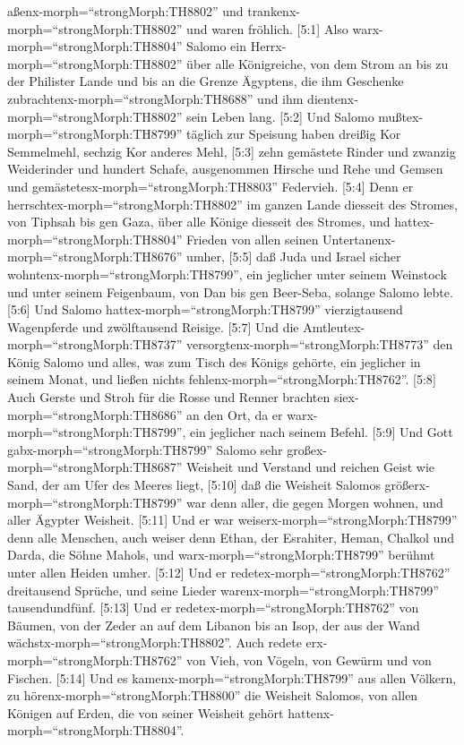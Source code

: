 aßenx-morph=``strongMorph:TH8802'' und
trankenx-morph=``strongMorph:TH8802'' und waren fröhlich. 
{[}5:1{]} Also warx-morph=``strongMorph:TH8804'' Salomo ein
Herrx-morph=``strongMorph:TH8802'' über alle Königreiche, von dem Strom
an bis zu der Philister Lande und bis an die Grenze Ägyptens, die ihm
Geschenke zubrachtenx-morph=``strongMorph:TH8688'' und ihm
dientenx-morph=``strongMorph:TH8802'' sein Leben lang. 
{[}5:2{]} Und Salomo mußtex-morph=``strongMorph:TH8799'' täglich zur
Speisung haben dreißig Kor Semmelmehl, sechzig Kor anderes Mehl,
 {[}5:3{]} zehn gemästete Rinder und zwanzig Weiderinder
und hundert Schafe, ausgenommen Hirsche und Rehe und Gemsen und
gemästetesx-morph=``strongMorph:TH8803'' Federvieh. 
{[}5:4{]} Denn er herrschtex-morph=``strongMorph:TH8802'' im ganzen
Lande diesseit des Stromes, von Tiphsah bis gen Gaza, über alle Könige
diesseit des Stromes, und hattex-morph=``strongMorph:TH8804'' Frieden
von allen seinen Untertanenx-morph=``strongMorph:TH8676'' umher,
 {[}5:5{]} daß Juda und Israel sicher
wohntenx-morph=``strongMorph:TH8799'', ein jeglicher unter seinem
Weinstock und unter seinem Feigenbaum, von Dan bis gen Beer-Seba,
solange Salomo lebte.  {[}5:6{]} Und Salomo
hattex-morph=``strongMorph:TH8799'' vierzigtausend Wagenpferde und
zwölftausend Reisige.  {[}5:7{]} Und die
Amtleutex-morph=``strongMorph:TH8737''
versorgtenx-morph=``strongMorph:TH8773'' den König Salomo und alles, was
zum Tisch des Königs gehörte, ein jeglicher in seinem Monat, und ließen
nichts fehlenx-morph=``strongMorph:TH8762''.  {[}5:8{]}
Auch Gerste und Stroh für die Rosse und Renner brachten
siex-morph=``strongMorph:TH8686'' an den Ort, da er
warx-morph=``strongMorph:TH8799'', ein jeglicher nach seinem Befehl.
 {[}5:9{]} Und Gott gabx-morph=``strongMorph:TH8799''
Salomo sehr großex-morph=``strongMorph:TH8687'' Weisheit und Verstand
und reichen Geist wie Sand, der am Ufer des Meeres liegt, 
{[}5:10{]} daß die Weisheit Salomos größerx-morph=``strongMorph:TH8799''
war denn aller, die gegen Morgen wohnen, und aller Ägypter Weisheit.
 {[}5:11{]} Und er war weiserx-morph=``strongMorph:TH8799''
denn alle Menschen, auch weiser denn Ethan, der Esrahiter, Heman,
Chalkol und Darda, die Söhne Mahols, und
warx-morph=``strongMorph:TH8799'' berühmt unter allen Heiden umher.
 {[}5:12{]} Und er redetex-morph=``strongMorph:TH8762''
dreitausend Sprüche, und seine Lieder
warenx-morph=``strongMorph:TH8799'' tausendundfünf. 
{[}5:13{]} Und er redetex-morph=``strongMorph:TH8762'' von Bäumen, von
der Zeder an auf dem Libanon bis an Isop, der aus der Wand
wächstx-morph=``strongMorph:TH8802''. Auch redete
erx-morph=``strongMorph:TH8762'' von Vieh, von Vögeln, von Gewürm und
von Fischen.  {[}5:14{]} Und es
kamenx-morph=``strongMorph:TH8799'' aus allen Völkern, zu
hörenx-morph=``strongMorph:TH8800'' die Weisheit Salomos, von allen
Königen auf Erden, die von seiner Weisheit gehört
hattenx-morph=``strongMorph:TH8804''.

